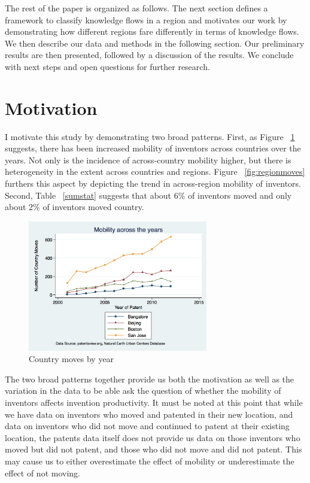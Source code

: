 \documentclass[12pt]{article}
\begin{document}
The rest of the paper is organized as follows. The next section defines a framework to classify knowledge flows in a region and motivates our work by demonstrating how different regions fare differently in terms of knowledge flows. We then describe our data and methods in the following section. Our preliminary results are then presented, followed by a discussion of the results. We conclude with next steps and open questions for further research.

\section{Motivation}
I motivate this study by demonstrating two broad patterns.  First, as Figure ~\ref{fig:countrymoves} suggests,  there has been increased mobility of inventors across countries over the years. Not only is the incidence of across-country mobility higher, but there is heterogeneity in the extent across countries and regions. Figure ~\ref{fig:regionmoves} furthers this aspect by depicting the trend in across-region mobility of inventors. Second, Table ~\ref{sumstat} suggests that about 6\% of inventors moved  and only about 2\% of inventors moved country. 

\begin{figure}[h]
\begin{centering}
  \includegraphics[width=0.7\textwidth]{countrymoves}
  \caption{Country moves by year}
   \label{fig:countrymoves}
\end{centering}
\end{figure}

The two broad patterns together provide us both the motivation as well as the variation in the data to be able ask the question of whether the mobility of inventors affects invention productivity. It must be noted at this point that while we have data on inventors who moved and patented in their new location, and data on inventors who did not move and continued to patent at their existing location, the patents data itself does not provide us data on those inventors who moved but did not patent, and those who did not move and did not patent. This may cause us to either overestimate the effect of mobility or underestimate the effect of not moving. 
\end{document}
